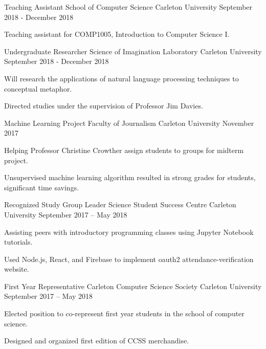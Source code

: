 \documentclass[]{awesome-cv}
\begin{document}
\vspace{-4.5mm}
\begin{cventries}  
    \cventry
      {Teaching Assistant}
      {School of Computer Science}
      {Carleton University}
      {September 2018 - December 2018}
      {\begin{cvitems}
          \item {Teaching assistant for COMP1005, Introduction to Computer Science I.}
          \end{cvitems}}	
    
    \vspace{-4mm}
    \cventry
      {Undergraduate Researcher}
      {Science of Imagination Laboratory}
      {Carleton University}
      {September 2018 - December 2018}
      {\begin{cvitems}
          \item {Will research the applications of natural language processing techniques to conceptual metaphor.}
          \item {Directed studies under the supervision of Professor Jim Davies.}
          \end{cvitems}}	
   
    \vspace{-4mm}
    \cventry
      {Machine Learning Project}
      {Faculty of Journalism}
      {Carleton University}
      {November 2017}
      {\begin{cvitems}
      	\item{Helping Professor Christine Crowther assign students to groups for midterm project.}
        \item{Unsupervised machine learning algorithm resulted in strong grades for students, significant time savings.}
      \end{cvitems}}
    
    \vspace{-4mm}
    \cventry
	{Recognized Study Group Leader}
	{Science Student Success Centre}
	{Carleton University}
	{September 2017 – May 2018}
	{\begin{cvitems}
		\item {Assisting peers with introductory programming classes using Jupyter Notebook tutorials.}
		\item {Used Node.js, React, and Firebase to implement oauth2 attendance-verification website.}
		\end{cvitems}}
		
	\vspace{-4mm}
    \cventry
	{First Year Representative}
	{Carleton Computer Science Society}
	{Carleton University}
	{September 2017 – May 2018}
	{\begin{cvitems}
		\item {Elected position to co-represent first year students in the school of computer science.}
		\item {Designed and organized first edition of CCSS merchandise.}
		\end{cvitems}}
\end{cventries}
\end{document}
